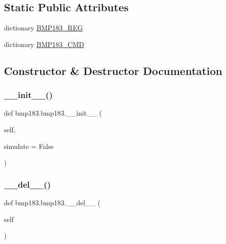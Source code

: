 \subsection*{Static Public Attributes}
\begin{DoxyCompactItemize}
\item 
dictionary \hyperlink{classbmp183_1_1bmp183_ab907f6f3c1aef0a95df7f653c613f79f}{B\+M\+P183\+\_\+\+R\+EG}
\item 
dictionary \hyperlink{classbmp183_1_1bmp183_adfc4b0a2ebdb9b408e1fe027c94aae30}{B\+M\+P183\+\_\+\+C\+MD}
\end{DoxyCompactItemize}


\subsection{Constructor \& Destructor Documentation}
\mbox{\label{classbmp183_1_1bmp183_abff9456bd2e262738b3d2bc8d75fb931}} 
\subsubsection{\texorpdfstring{\+\_\+\+\_\+init\+\_\+\+\_\+()}{\_\_init\_\_()}}
{\footnotesize\ttfamily def bmp183.\+bmp183.\+\_\+\+\_\+init\+\_\+\+\_\+ (\begin{DoxyParamCaption}\item[{}]{self,  }\item[{}]{simulate = {\ttfamily False} }\end{DoxyParamCaption})}

\mbox{\label{classbmp183_1_1bmp183_a07d23f8009ce9777dfe09ae86520d090}} 
\subsubsection{\texorpdfstring{\+\_\+\+\_\+del\+\_\+\+\_\+()}{\_\_del\_\_()}}
{\footnotesize\ttfamily def bmp183.\+bmp183.\+\_\+\+\_\+del\+\_\+\+\_\+ (\begin{DoxyParamCaption}\item[{}]{self }\end{DoxyParamCaption})}



